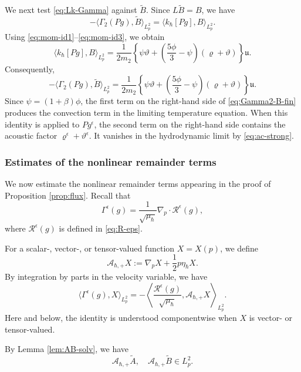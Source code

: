 \documentclass[10pt,reqno]{amsart}
\numberwithin{equation}{section}
\newcommand{\lt}{\left}
\newcommand{\rt}{\right}
\newcommand{\lal}{\langle}
\newcommand{\ral}{\rangle}
\newcommand{\vrh}{\varrho}
\newcommand{\vth}{\vartheta}
\newcommand{\mfu}{\mathfrak{u}}
\newcommand{\bq}{\begin{equation}}
\newcommand{\eq}{\end{equation}}
\newcommand{\calA}{\mathcal A}
\newcommand{\calR}{\mathcal R}
\begin{document}
We next test \eqref{eq:Lk-Gamma} against $\widetilde B $. Since $L \widetilde B  = B$, we have
\[
-\lal \Gamma_2 (P g), \widetilde B  \ral_{L^2_p} = \lal k_\hbar[P g], B  \ral_{L^2_p}.
\]
Using \eqref{eq:mom-id1}--\eqref{eq:mom-id3}, we obtain
\[
\lal k_\hbar[P g], B  \ral_{L^2_p} = \frac{1}{2m_2 } \lt\{ \psi \vth + \lt( \frac{5\phi }{3}-\psi\rt) \lt( \vrh+\vth \rt) \rt\} \mfu.
\]
Consequently,
\bq\label{eq:Gamma2-B-fin}
-\lal \Gamma_2 (P g), \widetilde B  \ral_{L^2_p} = \frac{1}{2m_2 } \lt\{ \psi \vth + \lt( \frac{5\phi }{3}-\psi \rt) \lt( \vrh+\vth \rt) \rt\} \mfu.
\eq
Since $\psi  = (1+\beta )\phi$, the first term on the right-hand side of \eqref{eq:Gamma2-B-fin} produces the convection term in the limiting temperature equation. When this identity is applied to $P g^\epsilon$, the second term on the right-hand side contains the acoustic factor $\vrh^\epsilon+\vth^\epsilon$. It vanishes in the hydrodynamic limit by \eqref{eq:ac-strong}.

 
%
%
%
%
%
%
%
%
%
%
 
\subsubsection{Estimates of the nonlinear remainder terms}

We now estimate the nonlinear remainder terms appearing in the proof of Proposition \ref{prop:flux}. Recall that
\[
\Gamma^\epsilon(g) = \frac{1}{\sqrt{\mu_\hbar}} \nabla_p\cdot \calR^\epsilon(g),
\]
where $\calR^\epsilon(g)$ is defined in \eqref{eq:R-eps}.

For a scalar-, vector-, or tensor-valued function $X=X(p)$, we define
\[
\calA_{\hbar,+}X := \nabla_pX + \frac{1}{2} p\eta_\hbar X.
\]
By integration by parts in the velocity variable, we have
\bq\label{eq:Gam-pair}
\lal \Gamma^\epsilon(g), X \ral_{L^2_p} = - \lt\lal \frac{ \calR^\epsilon(g) }{ \sqrt{\mu_\hbar} }, \calA_{\hbar,+}X \rt\ral_{L^2_p}.
\eq
Here and below, the identity is understood componentwise when $X$ is vector- or tensor-valued.

By Lemma \ref{lem:AB-solv}, we have
\bq\label{eq:Aplus-AB}
\calA_{\hbar,+} \widetilde A , \quad \calA_{\hbar,+} \widetilde B  \in L^2_p.
\eq
\end{document}
